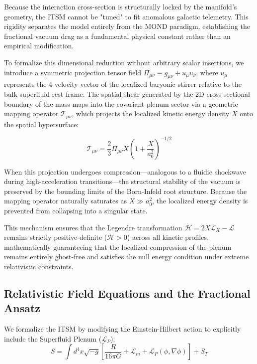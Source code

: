 \documentclass[aps,prd,10pt,twocolumn,superscriptaddress,nofootinbib]{revtex4-2}
\begin{document}
Because the interaction cross-section is structurally locked by the manifold's geometry, the ITSM cannot be "tuned" to fit anomalous galactic telemetry. This rigidity separates the model entirely from the MOND paradigm, establishing the fractional vacuum drag as a fundamental physical constant rather than an empirical modification.

To formalize this dimensional reduction without arbitrary scalar insertions, we introduce a symmetric projection tensor field $\Pi_{\mu\nu} \equiv g_{\mu\nu} + u_{\mu}u_{\nu}$, where $u_{\mu}$ represents the 4-velocity vector of the localized baryonic stirrer relative to the bulk superfluid rest frame. The spatial shear generated by the 2D cross-sectional boundary of the mass maps into the covariant plenum sector via a geometric mapping operator $\mathcal{T}_{\mu\nu}$, which projects the localized kinetic energy density $X$ onto the spatial hypersurface:

\begin{equation}
\mathcal{T}_{\mu\nu} = \frac{2}{3} \Pi_{\mu\nu} X \left( 1 + \frac{X}{a_0^2} \right)^{-1/2}
\end{equation}

When this projection undergoes compression—analogous to a fluidic shockwave during high-acceleration transitions—the structural stability of the vacuum is preserved by the bounding limits of the Born-Infeld root structure. Because the mapping operator naturally saturates as $X \gg a_0^2$, the localized energy density is prevented from collapsing into a singular state. 

This mechanism ensures that the Legendre transformation $\mathcal{H} = 2X\mathcal{L}_X - \mathcal{L}$ remains strictly positive-definite ($\mathcal{H} > 0$) across all kinetic profiles, mathematically guaranteeing that the localized compression of the plenum remains entirely ghost-free and satisfies the null energy condition under extreme relativistic constraints.

\subsection{Relativistic Field Equations and the Fractional Ansatz}
We formalize the ITSM by modifying the Einstein-Hilbert action to explicitly include the Superfluid Plenum ($\mathcal{L}_P$):
\begin{equation}
S = \int d^4x \sqrt{-g} \left[ \frac{R}{16\pi G} + \mathcal{L}_m + \mathcal{L}_P(\phi, \nabla\phi) \right] + S_T
\end{equation}
\end{document}
